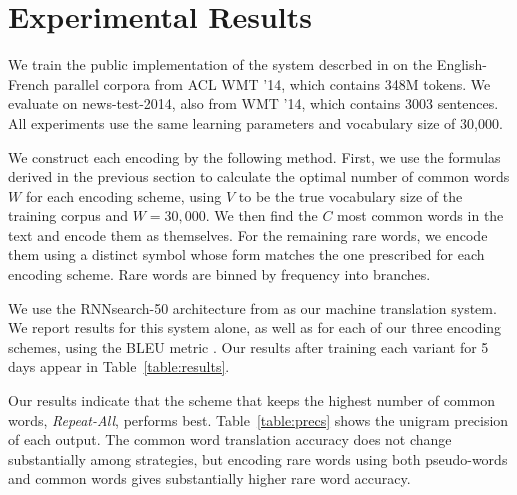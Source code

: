\section{Experimental Results}
\label{sec:exp}

We train the public implementation of the system descrbed in
 on the English-French parallel corpora
from ACL WMT '14, which contains 348M tokens. We evaluate on news-test-2014,
also from WMT '14, which contains 3003 sentences. All experiments use the same
learning parameters and vocabulary size of 30,000.

We construct each encoding by the following method. First, we use the formulas
derived in the previous section to calculate the optimal number of common words
$W$ for each encoding scheme, using $V$ to be the true vocabulary size of the
training corpus and $W = 30,000$. We then find the $C$ most common words in the
text and encode them as themselves. For the remaining rare words, we encode
them using a distinct symbol whose form matches the one prescribed for each
encoding scheme. Rare words are binned by frequency into branches.

We use the RNNsearch-50 architecture from 
as our machine translation system. We report results for this system alone, as
well as for each of our three encoding schemes, using the BLEU metric
\cite{bleu}. Our results after training each variant for 5 days appear in
Table~\ref{table:results}.

Our results indicate that the scheme that keeps the highest number of common
words, \emph{Repeat-All}, performs best. Table~\ref{table:precs} shows the
unigram precision of each output. The common word translation accuracy does not
change substantially among strategies, but encoding rare words using both
pseudo-words and common words gives substantially higher rare word accuracy.

\begin{table}
  \centering
  \vspace{8pt}
  \caption{BLEU scores on detokenized test set for various encoding
    schemes after training for 5 days.}
  \label{table:results}
\end{table}

